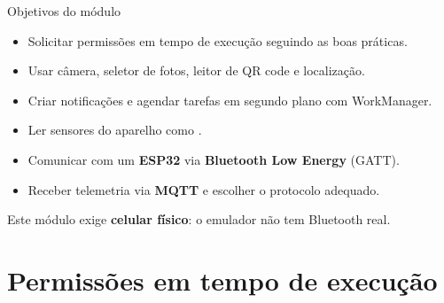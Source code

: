 \documentclass[aspectratio=169,10pt]{beamer}
\begin{document}
\capa

\begin{frame}{Objetivos do módulo}
  \begin{conceito}
    \begin{itemize}
      \item Solicitar permissões em tempo de execução seguindo as boas práticas.
      \item Usar câmera, seletor de fotos, leitor de QR code e localização.
      \item Criar notificações e agendar tarefas em segundo plano com WorkManager.
      \item Ler sensores do aparelho como .
      \item Comunicar com um \textbf{ESP32} via \textbf{Bluetooth Low Energy} (GATT).
      \item Receber telemetria via \textbf{MQTT} e escolher o protocolo adequado.
    \end{itemize}
  \end{conceito}
  \begin{atencao}
    Este módulo exige \textbf{celular físico}: o emulador não tem Bluetooth real.
  \end{atencao}
\end{frame}

\sumario



\section{Permissões em tempo de execução}
\end{document}
